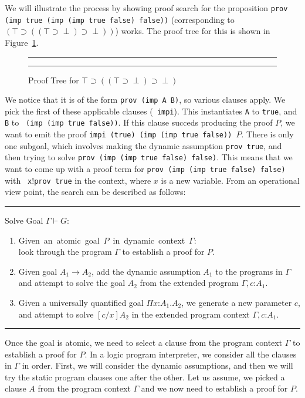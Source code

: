 \documentclass{acmconf}
\newcommand{\figfoot}{\vspace{1ex}\hrule}
\newcommand{\fighead}{\hrule\vspace{1.5ex}}
\newcommand{\vd}{\vdash}
\newcommand{\arrow}{\rightarrow}
\newcommand{\oftp}{\mathord{:}}
\begin{document}
We will illustrate the process by showing proof search for the
proposition {\tt prov (imp true (imp (imp true false) false))}
(corresponding to $(\top \supset ((\top \supset \perp) \supset
\perp))$) works.  The proof tree for this is shown in
Figure~\ref{prooftree1}.

\begin{figure}
\fighead
{}
\caption{\label{prooftree1} Proof Tree for 
$\top\supset((\top\supset\perp)\supset\perp)$}
\figfoot
\end{figure}
      
We notice that it is of the form {\tt prov (imp A B)}, so various clauses
apply. We pick the first of these applicable clauses ({\tt
impi}). This instantiates {\tt A} to {\tt true}, and {\tt B} to {\tt
(imp (imp true false))}.  If this clause succeds producing the proof
$P$, we want to emit the proof {\tt impi (true) (imp (imp true false))
$P$}.  There is only one subgoal, which involves making the dynamic
assumption {\tt prov true}, and then trying to solve {\tt prov (imp
(imp true false) false)}. This means that we want to come up with a
proof term for {\tt prov~(imp~(imp~true~false)~false)} with {\tt
x$!$prov true} in the context, where $x$ is a new variable. From an
operational view point, the search can be described as follows:

\fighead
\begin{small}
Solve Goal $\Gamma \vd G$:
\begin{enumerate}
\item \mbox{Given an atomic goal $P$ in dynamic context $\Gamma$:}\hfill\\
     look through the program $\Gamma$ to establish a proof for $P$.

\item Given goal $A_1 \arrow A_2$, add the dynamic assumption $A_1$ to the
  programs in $\Gamma$ and attempt to solve the goal $A_2$ from the extended
  program $\Gamma, c\oftp A_1$.
\item Given a universally quantified goal $\Pi x\oftp A_1. A_2$, we
     generate a new parameter $c$, and attempt to solve $[c/x]A_2$ in the
    extended program context $\Gamma, c\oftp A_1$.
\end{enumerate}
\end{small}
\figfoot 

Once the goal is atomic, we need to select a clause from the
program context $\Gamma$ to establish a proof for $P$. In a logic
program interpreter, we consider all the clauses in $\Gamma$ in order. 
First, we will consider the dynamic assumptions, and then we will try
the static program clauses one after the other. 
Let us assume, we picked a clause $A$ from the program context
$\Gamma$ and we now need to establish a proof for $P$.
\end{document}
